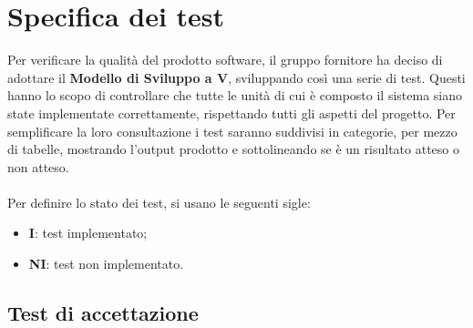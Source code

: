 \section{Specifica dei test}
Per verificare la qualità del prodotto software, il gruppo fornitore ha deciso di adottare il \textbf{Modello di Sviluppo a V}\glo, sviluppando così una serie di test. Questi hanno lo scopo di controllare che tutte le unità di cui è composto il sistema siano state implementate correttamente, rispettando tutti gli aspetti del progetto.
Per semplificare la loro consultazione i test saranno suddivisi in categorie, per mezzo di tabelle, mostrando l'output prodotto e sottolineando se è un risultato atteso o non atteso.
\\ \\
Per definire lo stato dei test, si usano le seguenti sigle:
\begin{itemize}
\item \textbf{I}: test implementato;
\item \textbf{NI}: test non implementato.
\end{itemize}

\subsection{Test di accettazione}

